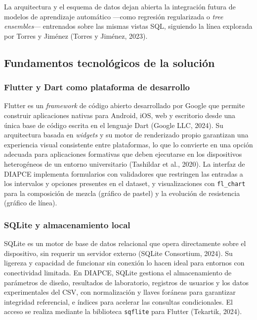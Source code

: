 La arquitectura y el esquema de datos dejan abierta la integración futura de modelos de aprendizaje automático ---como regresión regularizada o \textit{tree ensembles}--- entrenados sobre las mismas vistas SQL, siguiendo la línea explorada por Torres y Jiménez (Torres y Jiménez, 2023).

\subsection{Fundamentos tecnológicos de la solución}

\subsubsection*{Flutter y Dart como plataforma de desarrollo}

Flutter es un \textit{framework} de código abierto desarrollado por Google que permite construir aplicaciones nativas para Android, iOS, web y escritorio desde una única base de código escrita en el lenguaje Dart (Google LLC, 2024). Su arquitectura basada en \textit{widgets} y su motor de renderizado propio garantizan una experiencia visual consistente entre plataformas, lo que lo convierte en una opción adecuada para aplicaciones formativas que deben ejecutarse en los dispositivos heterogéneos de un entorno universitario (Tashildar et al., 2020). La interfaz de DIAPCE implementa formularios con validadores que restringen las entradas a los intervalos y opciones presentes en el dataset, y visualizaciones con \texttt{fl\_chart} para la composición de mezcla (gráfico de pastel) y la evolución de resistencia (gráfico de línea).

\subsubsection*{SQLite y almacenamiento local}

SQLite es un motor de base de datos relacional que opera directamente sobre el dispositivo, sin requerir un servidor externo (SQLite Consortium, 2024). Su ligereza y capacidad de funcionar sin conexión lo hacen ideal para entornos con conectividad limitada. En DIAPCE, SQLite gestiona el almacenamiento de parámetros de diseño, resultados de laboratorio, registros de usuarios y los datos experimentales del CSV, con normalización y llaves foráneas para garantizar integridad referencial, e índices para acelerar las consultas condicionales. El acceso se realiza mediante la biblioteca \texttt{sqflite} para Flutter (Tekartik, 2024).

